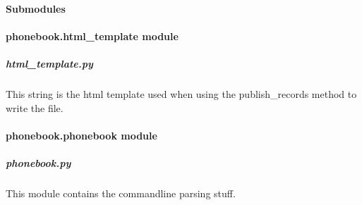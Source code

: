 \documentclass[letterpaper,10pt,english]{sphinxmanual}
\begin{document}
\paragraph{Submodules}
\label{\detokenize{phonebook:submodules}}

\paragraph{phonebook.html\_template module}
\label{\detokenize{phonebook:module-phonebook.html_template}}\label{\detokenize{phonebook:phonebook-html-template-module}}

\subparagraph{html\_template.py}
\label{\detokenize{phonebook:html-template-py}}
This string is the html template used when using the publish\_records method to write the file.


\paragraph{phonebook.phonebook module}
\label{\detokenize{phonebook:module-phonebook.phonebook}}\label{\detokenize{phonebook:phonebook-phonebook-module}}

\subparagraph{phonebook.py}
\label{\detokenize{phonebook:phonebook-py}}
This module contains the commandline parsing stuff.

\begin{fulllineitems}
\label{\detokenize{phonebook:phonebook.phonebook.help_description}}
\end{fulllineitems}


\begin{fulllineitems}
\label{\detokenize{phonebook:phonebook.phonebook.parse_args}}
\end{fulllineitems}
\end{document}
